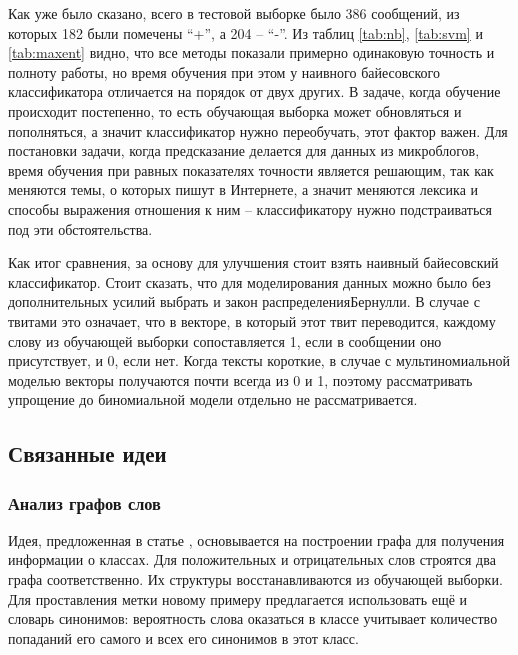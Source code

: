 Как уже было сказано, всего в тестовой выборке было 386 сообщений, из которых 182 были помечены
``+'', а 204 -- ``-''. Из таблиц \ref{tab:nb}, \ref{tab:svm} и \ref{tab:maxent} видно, что все методы показали
примерно одинаковую точность и полноту работы, но время обучения при этом у наивного байесовского
классификатора отличается на порядок от двух других. В задаче, когда обучение происходит постепенно,
то есть обучающая выборка может обновляться и пополняться, а значит классификатор нужно переобучать,
этот фактор важен. Для постановки задачи, когда предсказание делается для данных из
микроблогов, время обучения при равных показателях точности является решающим, так как меняются
темы, о которых пишут в Интернете, а значит меняются лексика и способы выражения отношения к ним --
классификатору нужно подстраиваться под эти обстоятельства.

Как итог сравнения, за основу для улучшения стоит взять наивный байесовский классификатор. Стоит
сказать, что для моделирования данных можно было без дополнительных усилий выбрать и закон распределенияБернулли. В случае с твитами это означает, что в векторе, в который этот твит
переводится, каждому слову из обучающей выборки сопоставляется 1, если в сообщении оно присутствует,
и 0, если нет. Когда тексты короткие, в случае с мультиномиальной моделью векторы
получаются почти всегда из 0 и 1, поэтому рассматривать упрощение до биномиальной модели отдельно не
рассматривается.

\subsection{Связанные идеи}

\subsubsection{Анализ графов слов}
Идея, предложенная в статье \cite{Colace2013}, основывается на построении графа для получения
информации о классах. Для положительных и отрицательных слов строятся два графа
соответственно. Их структуры восстанавливаются из обучающей выборки. Для проставления метки новому
примеру предлагается использовать ещё и словарь синонимов: вероятность слова оказаться в классе учитывает количество
попаданий его самого и всех его синонимов в этот класс.

